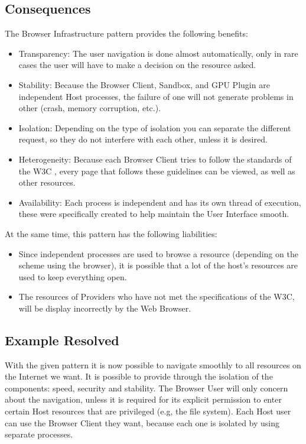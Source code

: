 \documentclass{sig-alternate-05-2015}
\begin{document}
  \subsection*{Consequences}
  The Browser Infrastructure pattern provides the following benefits:
  \begin{itemize}
    \item Transparency: The user navigation is done almost automatically, only in rare cases the user will have to make a decision on the resource asked.
    \item Stability: Because the Browser Client, Sandbox, and GPU  Plugin are independent Host processes, the failure of one will not generate problems in other (crash, memory corruption, etc.).
    \item Isolation: Depending on the type of isolation you can separate the different request, so they do not interfere with each other, unless it is desired.
    \item Heterogeneity: Because each Browser Client tries to follow the standards of the W3C \cite{w3c}, every page that follows these guidelines can be viewed, as well as other resources.
    \item Availability: Each process is independent and has its own thread of execution, these were specifically created to help maintain the User Interface smooth.
  \end{itemize}
  At the same time, this pattern has the following liabilities:
  \begin{itemize}
    \item Since independent processes are used to browse a resource (depending on the scheme using the browser), it is possible that a lot of the host's resources are used to keep everything open.
    \item The resources of Providers who have not met the specifications of the W3C, will be display incorrectly by the Web Browser.
  \end{itemize}

  \subsection*{Example Resolved}
With the given pattern it is now possible to navigate smoothly to all resources on the Internet we want. It is possible to provide through the isolation of the components: speed, security and stability. The Browser User will only concern about the navigation, unless it is required for its explicit permission to enter certain Host resources that are privileged (e.g, the file system). Each Host user can use the Browser Client they want, because each one is isolated by using separate processes.
\end{document}
